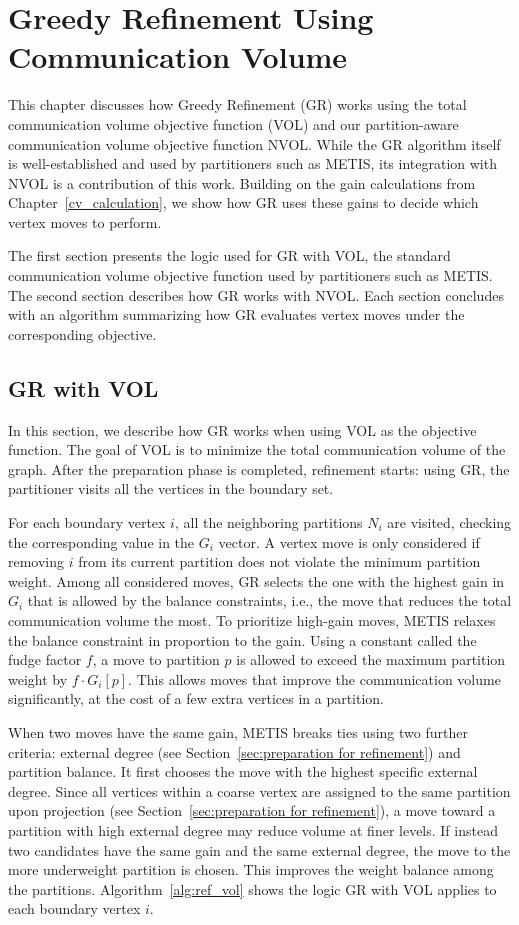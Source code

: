 \chapter{Greedy Refinement Using Communication Volume} \label{chapter5}
This chapter discusses how Greedy Refinement (GR) works using the total communication volume objective function (VOL) and our partition-aware communication volume objective function NVOL. While the GR algorithm itself is well-established and used by partitioners such as METIS, its integration with NVOL is a contribution of this work. Building on the gain calculations from Chapter~\ref{cv_calculation}, we show how GR uses these gains to decide which vertex moves to perform.

The first section presents the logic used for GR with VOL, the standard communication volume objective function used by partitioners such as METIS. The second section describes how GR works with NVOL. Each section concludes with an algorithm summarizing how GR evaluates vertex moves under the corresponding objective.

\section{GR with VOL}\label{sec:METIS refinement}
In this section, we describe how GR works when using VOL as the objective function. The goal of VOL is to minimize the total communication volume of the graph. After the preparation phase is completed, refinement starts: using GR, the partitioner visits all the vertices in the boundary set.  

For each boundary vertex $i$, all the neighboring partitions $N_i$ are visited, checking the corresponding value in the $G_i$ vector. A vertex move is only considered if removing $i$ from its current partition does not violate the minimum partition weight. Among all considered moves, GR selects the one with the highest gain in $G_i$ that is allowed by the balance constraints, i.e., the move that reduces the total communication volume the most. To prioritize high-gain moves, METIS relaxes the balance constraint in proportion to the gain. Using a constant called the fudge factor $f$, a move to partition $p$ is allowed to exceed the maximum partition weight by $f\cdot G_i[p]$. This allows moves that improve the communication volume significantly, at the cost of a few extra vertices in a partition.

When two moves have the same gain, METIS breaks ties using two further criteria: external degree (see Section~\ref{sec:preparation for refinement}) and partition balance. It first chooses the move with the highest specific external degree. Since all vertices within a coarse vertex are assigned to the same partition upon projection (see Section~\ref{sec:preparation for refinement}), a move toward a partition with high external degree may reduce volume at finer levels. If instead two candidates have the same gain and the same external degree, the move to the more underweight partition is chosen. This improves the weight balance among the partitions. Algorithm~\ref{alg:ref_vol} shows the logic GR with VOL applies to each boundary vertex $i$. 

